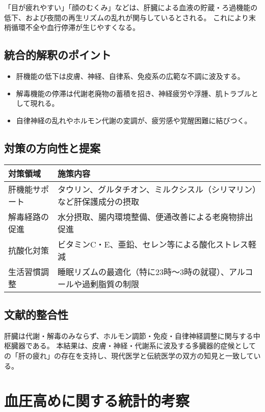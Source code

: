 \documentclass[a4paper,12pt]{article}
\begin{document}
「目が疲れやすい」「顔のむくみ」などは、肝臓による血液の貯蔵・ろ過機能の低下、および夜間の再生リズムの乱れが関与しているとされる。  
これにより末梢循環不全や血行停滞が生じやすくなる。

\subsection*{統合的解釈のポイント}

\begin{itemize}
  \item 肝機能の低下は皮膚、神経、自律系、免疫系の広範な不調に波及する。
  \item 解毒機能の停滞は代謝老廃物の蓄積を招き、神経疲労や浮腫、肌トラブルとして現れる。
  \item 自律神経の乱れやホルモン代謝の変調が、疲労感や覚醒困難に結びつく。
\end{itemize}

\subsection*{対策の方向性と提案}

\begin{table}[H]
\centering
\begin{tabular}{|l|p{10cm}|}
\hline
対策領域 & 施策内容 \\
\hline
肝機能サポート & タウリン、グルタチオン、ミルクシスル（シリマリン）など肝保護成分の摂取 \\
解毒経路の促進 & 水分摂取、腸内環境整備、便通改善による老廃物排出促進 \\
抗酸化対策 & ビタミンC・E、亜鉛、セレン等による酸化ストレス軽減 \\
生活習慣調整 & 睡眠リズムの最適化（特に23時〜3時の就寝）、アルコールや過剰脂質の制限 \\
\hline
\end{tabular}
\end{table}

\subsection*{文献的整合性}

肝臓は代謝・解毒のみならず、ホルモン調節・免疫・自律神経調整に関与する中枢臓器である。  
本結果は、皮膚・神経・代謝系に波及する多臓器的症候としての「肝の疲れ」の存在を支持し、現代医学と伝統医学の双方の知見と一致している。


\section{血圧高めに関する統計的考察}
\end{document}
